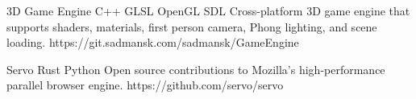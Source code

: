 



\begin{cvprojects}

\cvproject
{3D Game Engine}
{C++ \textbullet{} GLSL \textbullet{} OpenGL \textbullet{} SDL}
{
Cross-platform 3D game engine that supports shaders, materials, first person camera, Phong lighting, and scene loading.
    \vspace{2mm} %
}
{https://git.sadmansk.com/sadmansk/GameEngine}


\cvproject
{Servo}
{Rust \textbullet{} Python}
{
Open source contributions to Mozilla's high-performance parallel browser engine.
}
{https://github.com/servo/servo}


\end{cvprojects}
